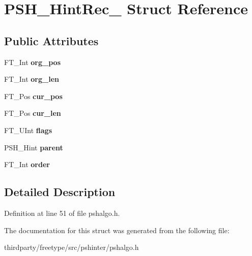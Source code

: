 \hypertarget{struct_p_s_h___hint_rec__}{}\section{P\+S\+H\+\_\+\+Hint\+Rec\+\_\+ Struct Reference}
\label{struct_p_s_h___hint_rec__}
\subsection*{Public Attributes}
\begin{DoxyCompactItemize}
\item 
\mbox{\label{struct_p_s_h___hint_rec___a5b9c43cb55883d1c5c6ebc14cc20589c}} 
F\+T\+\_\+\+Int {\bfseries org\+\_\+pos}
\item 
\mbox{\label{struct_p_s_h___hint_rec___a9fddbd1ef916b07d369ffbaddf03e01f}} 
F\+T\+\_\+\+Int {\bfseries org\+\_\+len}
\item 
\mbox{\label{struct_p_s_h___hint_rec___a1f1db2a58ece5aa38d0090e042e48dbb}} 
F\+T\+\_\+\+Pos {\bfseries cur\+\_\+pos}
\item 
\mbox{\label{struct_p_s_h___hint_rec___a5c648acdfd57863e8d5090ac857e35b0}} 
F\+T\+\_\+\+Pos {\bfseries cur\+\_\+len}
\item 
\mbox{\label{struct_p_s_h___hint_rec___a4b45f06c14abc6d3f0cbdd3138517e25}} 
F\+T\+\_\+\+U\+Int {\bfseries flags}
\item 
\mbox{\label{struct_p_s_h___hint_rec___a5ce3cd9fa37a643f25938a41dc6dcdb9}} 
P\+S\+H\+\_\+\+Hint {\bfseries parent}
\item 
\mbox{\label{struct_p_s_h___hint_rec___a4b813e4588e82ddf024b87831bedc766}} 
F\+T\+\_\+\+Int {\bfseries order}
\end{DoxyCompactItemize}


\subsection{Detailed Description}


Definition at line 51 of file pshalgo.\+h.



The documentation for this struct was generated from the following file\+:\begin{DoxyCompactItemize}
\item 
thirdparty/freetype/src/pshinter/pshalgo.\+h\end{DoxyCompactItemize}
